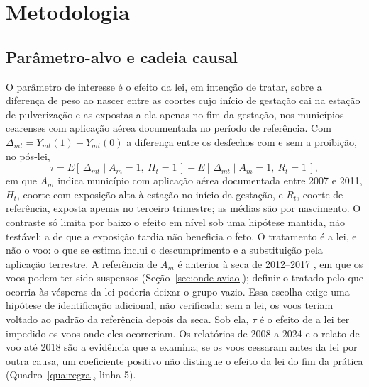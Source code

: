 
\chapter{Metodologia}
\label{cap:metodologia}

\section{Parâmetro-alvo e cadeia causal}

O parâmetro de interesse é o efeito da lei, em intenção de tratar, sobre a
diferença de peso ao nascer entre as coortes cujo início de gestação cai na
estação de pulverização e as expostas a ela apenas no fim da gestação, nos
municípios cearenses com aplicação aérea documentada no período de referência.
Com $\Delta_{mt} = Y_{mt}(1) - Y_{mt}(0)$ a diferença entre os desfechos com e
sem a proibição, no pós-lei,
\begin{equation}
  \tau = E\left[\,\Delta_{mt} \mid A_m = 1,\ H_t = 1\,\right]
       - E\left[\,\Delta_{mt} \mid A_m = 1,\ R_t = 1\,\right],
\end{equation}
em que $A_m$ indica município com aplicação aérea documentada entre 2007 e
2011, $H_t$, coorte com exposição alta à estação no início da gestação, e
$R_t$, coorte de referência, exposta apenas no terceiro trimestre; as médias
são por nascimento. O contraste só limita por baixo o efeito em nível sob uma
hipótese mantida, não testável: a de que a exposição tardia não beneficia o
feto. O tratamento é a lei, e não o voo: o que se estima inclui o
descumprimento e a substituição pela aplicação terrestre. A referência de
$A_m$ é anterior à seca de 2012--2017 \cite{rebello2018seca}, em que os voos
podem ter sido suspensos (Seção~\ref{sec:onde-aviao}); definir o tratado pelo
que ocorria às vésperas da lei poderia deixar o grupo vazio. Essa escolha
exige uma hipótese de identificação adicional, não verificada: sem a lei, os
voos teriam voltado ao padrão da referência depois da seca. Sob ela, $\tau$ é
o efeito de a lei ter impedido os voos onde eles ocorreriam. Os relatórios de
2008 a 2024 e o relato de voo até 2018 são a evidência que a examina; se os
voos cessaram antes da lei por outra causa, um coeficiente positivo não
distingue o efeito da lei do fim da prática (Quadro~\ref{qua:regra}, linha 5).

